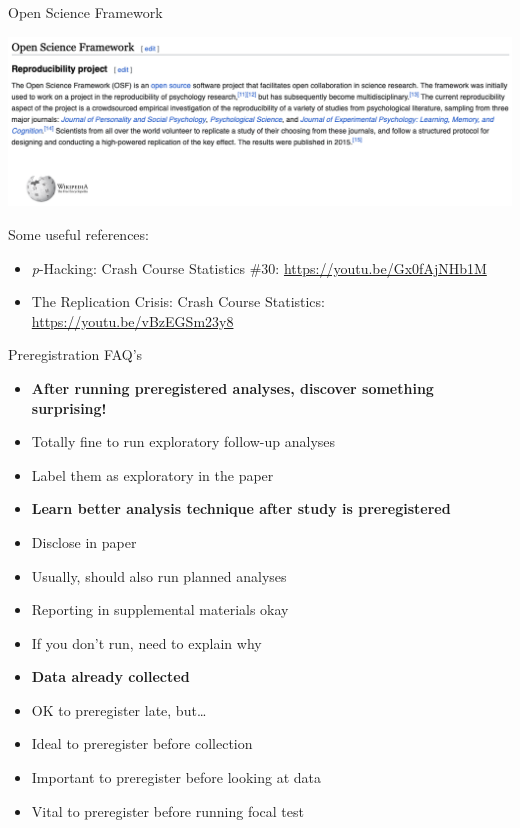 \documentclass[
  ignorenonframetext,
  aspectratio=169,
]{beamer}
\providecommand{\tightlist}{%
  \setlength{\itemsep}{0pt}\setlength{\parskip}{0pt}}\usepackage{longtable,booktabs,array}
\begin{document}
\begin{frame}{Open Science Framework}
\label{open-science-framework}
\begin{center}
\includegraphics{figs/osf.png}
\end{center}
\end{frame}

\begin{frame}{Some useful references:}
\label{some-useful-references}
\begin{itemize}
\tightlist
\item
  \emph{p}-Hacking: Crash Course Statistics \#30:
  \url{https://youtu.be/Gx0fAjNHb1M}
\item
  The Replication Crisis: Crash Course Statistics:
  \url{https://youtu.be/vBzEGSm23y8}
\end{itemize}
\end{frame}

\begin{frame}{Preregistration FAQ's}
\label{preregistration-faqs}
\begin{itemize}
\tightlist
\item
  \textbf{After running preregistered analyses, discover something
  surprising!}
\item
  Totally fine to run exploratory follow-up analyses
\item
  Label them as exploratory in the paper
\item
  \textbf{Learn better analysis technique after study is preregistered}
\item
  Disclose in paper
\item
  Usually, should also run planned analyses
\item
  Reporting in supplemental materials okay
\item
  If you don't run, need to explain why
\item
  \textbf{Data already collected}
\item
  OK to preregister late, but\ldots{}
\item
  Ideal to preregister before collection
\item
  Important to preregister before looking at data
\item
  Vital to preregister before running focal test
\end{itemize}
\end{frame}
\end{document}
